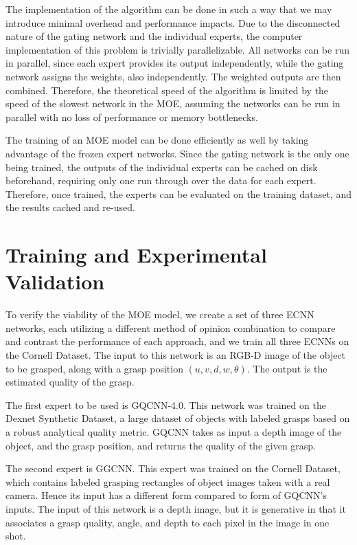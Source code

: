 \documentclass[letterpaper, 10 pt, conference]{ieeeconf}
\begin{document}
The implementation of the algorithm can be done in such a way that we may introduce minimal overhead and performance impacts.  Due to the disconnected nature of the gating network and the individual experts, the computer implementation of this problem is trivially parallelizable. All networks can be run in parallel, since each expert provides its output independently, while the gating network assigns the weights, also independently. The weighted outputs are then combined.  Therefore, the theoretical speed of the algorithm is limited by the speed of the slowest network in the MOE, assuming the networks can be run in parallel with no loss of performance or memory bottlenecks.

The training of an MOE model can be done efficiently as well by taking advantage of the frozen expert networks.  Since the gating network is the only one being trained, the outputs of the individual experts can be cached on disk beforehand, requiring only one run through over the data for each expert. Therefore, once trained, the experts can be evaluated on the training dataset, and the results cached and re-used.

\section{Training and Experimental Validation}
\label{sec:experimental_setup}

To verify the viability of the MOE model, we create a set of three ECNN networks, each utilizing a different method of opinion combination to compare and contrast the performance of each approach, and we train all three ECNNs on the Cornell Dataset.  The input to this network is an RGB-D image of the object to be grasped, along with a grasp position $(u, v, d, w, \theta)$.  The output is the estimated quality of the grasp.

The first expert to be used is GQCNN-4.0. This network was trained on the Dexnet Synthetic Dataset, a large dataset of objects with labeled grasps based on a robust analytical quality metric. GQCNN takes as input a depth image of the object, and the grasp position, and returns the quality of the given grasp.

The second expert is GGCNN. This expert was trained on the Cornell Dataset, which contains labeled grasping rectangles of object images taken with a real camera.  Hence its input has a different form compared to form of GQCNN's inputs. The input of this network is a depth image, but it is generative in that it associates a grasp quality, angle, and depth to each pixel in the image in one shot.
\end{document}
